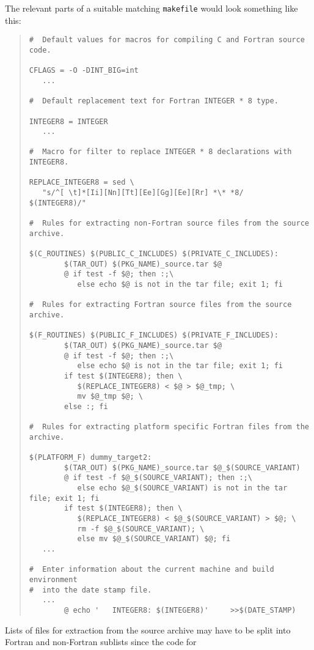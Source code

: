 \documentclass[twoside,11pt]{article}
\renewcommand{\_}{\texttt{\symbol{95}}}
\newcommand{\file}[1]{{\tt #1}}
\newenvironment{squote}{\begin{quote}\begin{small}}{\end{small}\end{quote}}
\begin{document}
The relevant parts of a suitable matching \file{makefile} would look 
something like this:
\begin{squote}
\begin{verbatim}
#  Default values for macros for compiling C and Fortran source code.

CFLAGS = -O -DINT_BIG=int
   ...

#  Default replacement text for Fortran INTEGER * 8 type.

INTEGER8 = INTEGER
   ...

#  Macro for filter to replace INTEGER * 8 declarations with INTEGER8.

REPLACE_INTEGER8 = sed \
   "s/^[ \t]*[Ii][Nn][Tt][Ee][Gg][Ee][Rr] *\* *8/      $(INTEGER8)/"

#  Rules for extracting non-Fortran source files from the source archive.

$(C_ROUTINES) $(PUBLIC_C_INCLUDES) $(PRIVATE_C_INCLUDES):
        $(TAR_OUT) $(PKG_NAME)_source.tar $@
        @ if test -f $@; then :;\
           else echo $@ is not in the tar file; exit 1; fi

#  Rules for extracting Fortran source files from the source archive.

$(F_ROUTINES) $(PUBLIC_F_INCLUDES) $(PRIVATE_F_INCLUDES):
        $(TAR_OUT) $(PKG_NAME)_source.tar $@
        @ if test -f $@; then :;\
           else echo $@ is not in the tar file; exit 1; fi
        if test $(INTEGER8); then \
           $(REPLACE_INTEGER8) < $@ > $@_tmp; \
           mv $@_tmp $@; \
        else :; fi

#  Rules for extracting platform specific Fortran files from the archive.

$(PLATFORM_F) dummy_target2:
        $(TAR_OUT) $(PKG_NAME)_source.tar $@_$(SOURCE_VARIANT)
        @ if test -f $@_$(SOURCE_VARIANT); then :;\
           else echo $@_$(SOURCE_VARIANT) is not in the tar file; exit 1; fi
        if test $(INTEGER8); then \
           $(REPLACE_INTEGER8) < $@_$(SOURCE_VARIANT) > $@; \
           rm -f $@_$(SOURCE_VARIANT); \
           else mv $@_$(SOURCE_VARIANT) $@; fi
   ...

#  Enter information about the current machine and build environment
#  into the date stamp file.
   ...
        @ echo '   INTEGER8: $(INTEGER8)'     >>$(DATE_STAMP)
\end{verbatim}
\end{squote}
Lists of files for extraction from the source archive may have to
be split into Fortran and non-Fortran sublists since the code for
\end{document}
